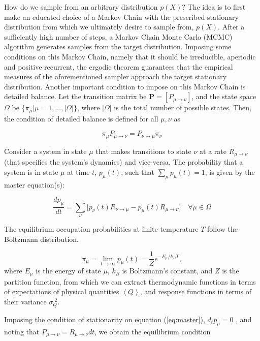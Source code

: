 How do we sample from an arbitrary distribution $p(X)$? The idea is to first make an educated choice of a Markov Chain with the prescribed stationary distribution from which we ultimately desire to sample from, $p(X)$. After a sufficiently high number of steps, a Markov Chain Monte Carlo (MCMC) algorithm generates samples from the target distribution. Imposing some conditions on this Markov Chain, namely that it should be irreducible, aperiodic and positive recurrent, the ergodic theorem guarantees that the empirical measures of the aforementioned sampler approach the target stationary distribution. Another important condition to impose on this Markov Chain is detailed balance. Let the transition matrix be $\bm P = [P_{\mu \rightarrow \nu}]$, and the state space $\Omega$ be $\{\pi_\mu | \mu=1, ..., |\Omega| \}$, where $|\Omega|$ is the total number of possible states. Then, the condition of detailed balance is defined for all $\mu, \nu$ as

\begin{equation}\label{eq:detBal}
\pi_\mu P_{\mu \rightarrow \nu} = P_{\nu \rightarrow \mu} \pi_\nu
\end{equation}

Consider a system in state $\mu$ that makes transitions to state $\nu$ at a rate $R_{\mu \rightarrow  \nu}$ (that specifies the system's dynamics) and vice-versa.
The probability that a system is in state $\mu$ at time $t$, $p_\mu (t)$, such that $\sum_\mu p_\mu (t) = 1$, is given by the master equation(s):

\begin{equation}\label{eq:master}
\frac{d p_\mu}{dt} = \sum_\nu \big[ p_\nu (t) R_{\nu \rightarrow \mu} - p_\mu (t) R_{\mu \rightarrow \nu} \big] \quad \forall \mu \in \Omega
\end{equation}

The equilibrium occupation probabilities at finite temperature $T$ follow the Boltzmann distribution.

\begin{equation}
\pi_\mu = \lim_{t \rightarrow \infty} p_\mu (t) = \frac{1}{Z} e^{ - E_\mu / k_B T} ,
\end{equation}
where $E_\mu$ is the energy of state $\mu$, $k_B$ is Boltzmann's constant, and $Z$ is the partition function, from which we can extract thermodynamic functions in terms of expectations of physical quantities $\left\langle Q \right\rangle$, and response functions in terms of their variance $\sigma_Q^{\,\, 2}$.

Imposing the condition of stationarity on equation (\ref{eq:master}), $d_t p_\mu = 0$ , and noting that $ P_{\mu\rightarrow \nu} = R_{\mu\rightarrow \nu}  dt$, we obtain the equilibrium condition

